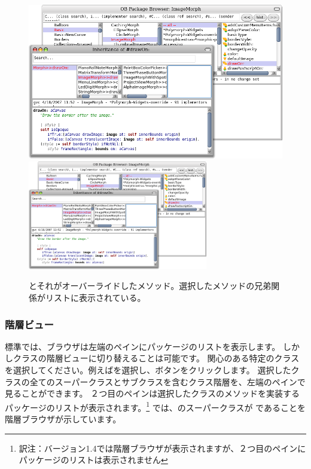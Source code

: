 \documentclass[a4paper,10pt,twoside]{book}
\begin{document}
\begin{figure}[btp]
\begin{center}
   \ifluluelse
{\includegraphics[width=\textwidth]{OBInheritanceOverriding}}
{\includegraphics[width=0.7\textwidth]{OBInheritanceOverriding}}
\end{center}
\caption{ とそれがオーバーライドしたメソッド。選択したメソッドの兄弟関係がリストに表示されている。}
\end{figure}

\subsubsection{階層ビュー}

標準では、ブラウザは左端のペインにパッケージのリストを表示します。
しかしクラスの階層ビューに切り替えることは可能です。
関心のある特定のクラスを選択してください。例えばを選択し、ボタンをクリックします。
選択したクラスの全てのスーパークラスとサブクラスを含むクラス階層を、左端のペインで見ることができます。
２つ目のペインは選択したクラスのメソッドを実装するパッケージのリストが表示されます。\footnote{訳注：バージョン1.4では階層ブラウザが表示されますが、２つ目のペインにパッケージのリストは表示されません}
では、のスーパークラスが であることを階層ブラウザが示しています。
\end{document}
